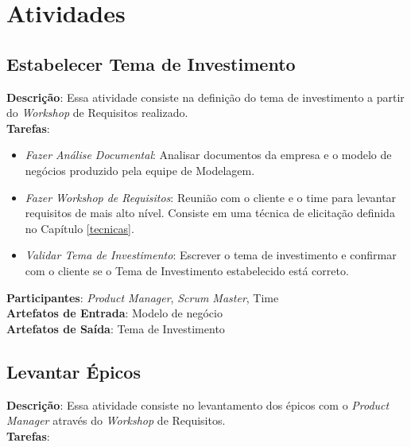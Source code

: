 \section{Atividades}

\subsection{Estabelecer Tema de Investimento}

  \textbf{Descrição}: Essa atividade consiste na definição do tema de investimento a partir do \textit{Workshop} de Requisitos realizado.\\

  \textbf{Tarefas}:

  \begin{itemize}
  
    \item \indent \textit{Fazer Análise Documental}: Analisar documentos da empresa e o modelo de negócios produzido pela equipe de Modelagem.
   
   \item \indent \textit{Fazer Workshop de Requisitos}: Reunião com o cliente e o time para levantar requisitos de mais alto nível. Consiste
   em uma técnica de elicitação definida no Capítulo \ref{tecnicas}.

   \item \indent \textit{Validar Tema de Investimento}: Escrever o tema de investimento e confirmar com o cliente se
   o Tema de Investimento estabelecido está correto.
  \end{itemize}

  \textbf{Participantes}: \textit{Product Manager}, \textit{Scrum Master}, Time \\

  \textbf{Artefatos de Entrada}: Modelo de negócio \\

  \textbf{Artefatos de Saída}: Tema de Investimento\\

\subsection{Levantar Épicos}
  \textbf{Descrição}: Essa atividade consiste no levantamento dos épicos com o \textit{Product Manager} através do  \textit{Workshop} de Requisitos. \\

  \textbf{Tarefas}:

